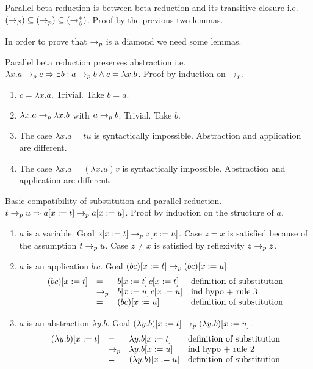 \begin{theorem}
  Parallel beta reduction is between beta reduction and its transitive closure
  i.e. $(\to_\beta) \subseteq (\to_{p}) \subseteq (\to^*_\beta)$.
  Proof by the previous two lemmas.
\end{theorem}




In order to prove that $\to_{p}$ is a diamond we need some lemmas.

\begin{lemma}
  Parallel beta reduction preserves abstraction i.e.
  $\lambda x.a \to_{p} c \Rightarrow \exists b : a \to_{p} b \land c = \lambda
  x.b$. Proof by induction on $\to_{p}$.
  \begin{enumerate}
  \item $c = \lambda x.a$. Trivial. Take $b = a$.
  \item $\lambda x.a \to_{p} \lambda x.b$ with $a \to_{p} b$. Trivial. Take $b$.
  \item The case $\lambda x.a = t u$ is syntactically impossible. Abstraction
    and application are different.
  \item The case $\lambda x.a = (\lambda x.u) v$ is syntactically
    impossible. Abstraction and application are different.
  \end{enumerate}
\end{lemma}


\begin{lemma}
  Basic compatibility of substitution and parallel reduction.
  $t \to_{p} u \Rightarrow a[x := t] \to_{p} a[x := u]$. Proof by induction on the
  structure of $a$.
  \begin{enumerate}
  \item $a$ is a variable. Goal $z[x := t] \to_{p} z[x := u]$. Case $z=x$
    is satisfied because of the assumption $t \to_{p} u$. Case $z\ne x$ is
    satisfied by reflexivity $z \to_{p} z$.
  \item
    $a$ is an application $b\, c$.
    Goal $(b c)[x:=t] \to_{p} (b c)[x:=u]$
    $$
    \begin{array}{llll}
      (b c)[x:=t] &=& b[x:=t]\, c[x:=t] &              \text{definition of substitution}\\
                      &\to_{p} & b[x:=u]\, c[x:=u] & \text{ind hypo + rule 3} \\
                      &=& (b c)[x:=u] &                       \text{definition of substitution}
    \end{array}
    $$
  \item
    $a$ is an abstraction $\lambda y.b$.
    Goal $(\lambda y.b)[x:=t] \to_{p} (\lambda y.b)[x:=u]$.
    $$
    \begin{array}{llll}
      (\lambda y.b)[x:=t] &=& \lambda y. b[x:=t]  &\text{definition of substitution}\\
      &\to_{p} & \lambda y.b[x:=u] &\text{ind hypo + rule 2} \\
      &=& (\lambda y.b)[x:=u] & \text{definition of substitution}
    \end{array}
    $$
  \end{enumerate}
\end{lemma}



